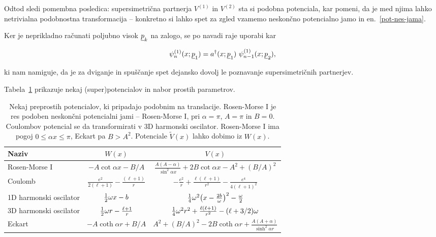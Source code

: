 \ni Odtod sledi pomembna posledica: supersimetri\v cna partnerja $V^{(1)}$ in $V^{(2)}$ sta si podobna potenciala, kar
pomeni, da je med njima lahko netrivialna podobnostna transformacija -- konkretno si lahko spet za zgled vzamemo
neskon\v cno potencialno jamo in en.~\eqref{pot-nes-jama}.

Ker je neprikladno ra\v cunati poljubno visok $\underline{p}_k$ na zalogo, se po navadi raje uporabi kar

\begin{equation}
	\psi^{(1)}_n (x; \underline{p}_1) = a^\dagger (x; \underline{p}_1)\ \psi_{n-1}^{(1)} (x; \underline{p}_2),
\end{equation}

\ni ki nam namiguje, da je za dviganje in spu\v s\v canje spet dejansko dovolj le poznavanje supersimetri\v cnih
partnerjev.

\ni Tabela~\ref{tab1} prikazuje nekaj (super)potencialov in nabor prostih parametrov.

\begin{table}[H]\centering
	\caption{Nekaj preprostih potencialov, ki pripadajo podobnim na translacije. Rosen-Morse I je res podoben
		neskon\v cni potencialni jami -- Rosen-Morse I, pri $\alpha = \pi$, $A = \pi$ in $B = 0$. Coulombov
		potencial se da transformirati v 3D harmonski oscilator. Rosen-Morse I ima pogoj $0 \leq \alpha x \leq \pi$,
		Eckart pa $B > A^2$. Potenciale $\tilde{V}(x)$ lahko dobimo iz $W(x)$.}
	\label{tab1}
	\vspace{0.2cm}
	\begin{tabular}{l || c | c}
		Naziv & $W(x)$ & $V(x)$\\ \hline
		Rosen-Morse I & $-A \cot \alpha x - B/A$ & $\frac{A (A - \alpha)}{\sin^2 \alpha x} + 2B\cot\alpha x - A^2
			+ (B/A)^2$ \\
		Coulomb & $\frac{e^2}{2(\ell+1)} - \frac{(\ell+1)}{r}$ & $-\frac{e^2}{r} + \frac{\ell(\ell+1)}{r^2} -
			\frac{e^4}{4(\ell + 1)^2}$ \\
		1D harmonski oscilator & $\frac{1}{2}\omega x - b$ & $\frac{1}{4}\omega^2\big(x - \frac{2b}{\omega}\big)^2 - \frac{\omega}{2}$ \\
		3D harmonski oscilator & $\frac{1}{2}\omega r - \frac{\ell + 1}{r}$ & $\frac{1}{4}\omega^2r^2 +
			\frac{\ell(\ell + 1)}{r^2} - (\ell + 3/2)\omega$ \\
		Eckart & $-A\coth\alpha r + B/A$ & $A^2 + (B/A)^2 - 2B\coth\alpha r + \frac{A(A + \alpha)}{\sinh^2 \alpha r}$ \\
	\end{tabular}
\end{table}

